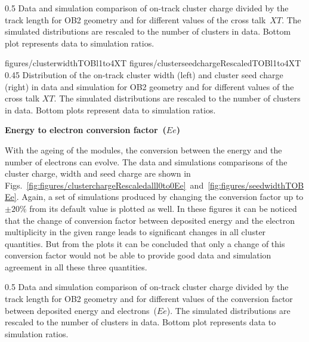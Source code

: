                  {0.5}       %
                 { Data and simulation comparison of on-track cluster charge divided by the track length for OB2 geometry and for different values of the cross talk~$XT$.  The simulated distributions are rescaled to the number of clusters in data.  Bottom plot represents data to simulation ratios. }

                 {figures/clusterwidthTOBl1to4XT}
                 {figures/clusterseedchargeRescaledTOBl1to4XT} %
                 {0.45}       %
                 { Distribution of the on-track cluster width (left) and cluster seed charge (right) in data and simulation for OB2 geometry and for different values of the cross talk $XT$.  The simulated distributions are rescaled to the number of clusters in data.  Bottom plots represent data to simulation ratios. }

\textbf{Energy to electron conversion factor~($Ee$)}

With the ageing of the modules, the conversion between the energy and the number of electrons can evolve. The data and simulations comparisons of the cluster charge, width and seed charge are shown in Figs.~\ref{fig:figures/clusterchargeRescaledalll0to0Ee}~and~\ref{fig:figures/seedwidthTOBEe}. Again, a set of simulations produced by changing the conversion factor up to $\pm 20\%$ from its default value is plotted as well. In these figures it can be noticed that the change of conversion factor between deposited energy and the electron multiplicity in the given range leads to significant changes in all cluster quantities. But from the plots it can be concluded that only a change of this conversion factor would not be able to provide good data and simulation agreement in all these three quantities.

                 {0.5}       %
                 { Data and simulation comparison of on-track cluster charge divided by the track length for OB2 geometry and for different values of the conversion factor between deposited energy and electrons~($Ee$). The simulated distributions are rescaled to the number of clusters in data.  Bottom plot represents data to simulation ratios. }

